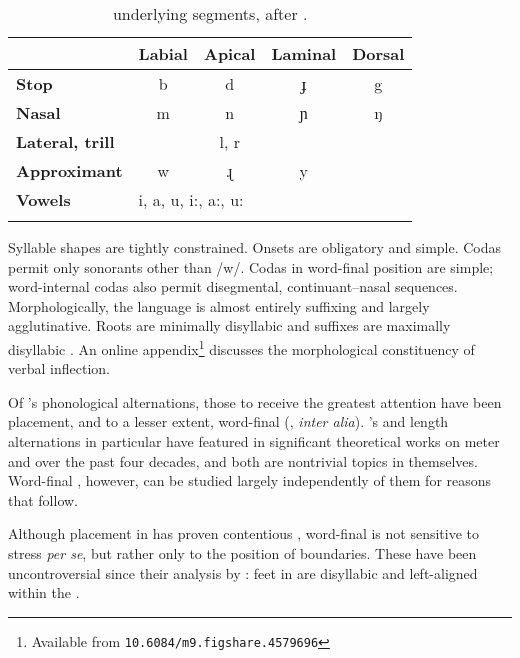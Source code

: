 \documentclass[output=paper,
modfonts
]{LSP/langsci}
\begin{document}
\begin{table}
\caption{ underlying segments, after \citet[32]{dixon1977a}.}
\label{tab:1R}
\begin{tabular}{lcccc}
\lsptoprule
 & \textbf{Labial} & \textbf{Apical} & \textbf{Laminal} & \textbf{Dorsal}\\
\midrule
\textbf{Stop} & b & d & ɟ & g\\
\textbf{Nasal} & m & n & ɲ & ŋ\\
\textbf{Lateral, trill} & & l, r & & \\
\textbf{Approximant} & w & ɻ & y & \\
\midrule
\textbf{Vowels} & \multicolumn{2}{l}{i, a, u, i:, a:, u:} & & \\
\lspbottomrule
\end{tabular}
\end{table}

Syllable shapes are tightly constrained. Onsets are obligatory and simple. Codas permit only sonorants other than /w/. Codas in word-final position are simple; word-internal codas also permit disegmental, continuant--nasal sequences. Morphologically, the language is almost entirely suffixing and largely agglutinative. Roots are minimally disyllabic and suffixes are maximally disyllabic \citep[35,90]{dixon1977a}. An online appendix\footnote{Available from \texttt{10.6084/m9.figshare.4579696}} discusses the morphological constituency of verbal inflection.

Of 's phonological alternations, those to receive the greatest attention have been  placement,  and to a lesser extent, word-final  (\citealt{dixon1977a,dixon1977b,hayes1982r,hayes1985,kager1993,crowhurst1995,halle1995,hall2001,pruitt2010,hyde2012,bowern}, \textit{inter alia}). 's  and length alternations in particular have featured in significant theoretical works on meter and  over the past four decades, and both are nontrivial topics in themselves. Word-final , however, can be studied largely independently of them for reasons that follow. 

Although  placement in  has proven contentious \citep{pruitt2010,bowern}, word-final  is not sensitive to stress \textit{per se}, but rather only to the position of  boundaries. These have been uncontroversial since their analysis by \citet{hayes1982r}: feet in  are disyllabic and left-aligned within the . 
\end{document}
